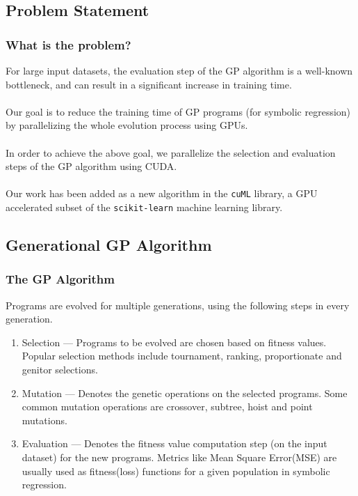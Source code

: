 \documentclass{beamer}
\begin{document}

\subsection{Problem Statement}

\begin{frame}
  \frametitle{What is the problem?}
  For large input datasets, the evaluation step of the GP algorithm is a well-known bottleneck, and can result in a significant increase in training time. \\~\\
  Our goal is to reduce the training time of GP programs (for symbolic regression) by parallelizing the whole evolution process using GPUs. \\~\\
  
  In order to achieve the above goal, we parallelize the selection and evaluation steps of the GP algorithm using CUDA. \\~\\
  
  Our work has been added as a new algorithm in the \texttt{cuML} library, a GPU accelerated subset of the \texttt{scikit-learn} machine learning library.
\end{frame}


\subsection{Generational GP Algorithm}

\begin{frame}
  \frametitle{The GP Algorithm}
  Programs are evolved for multiple generations, using the following steps in every generation. 
  \begin{enumerate}
    \item Selection --- Programs to be evolved are chosen based on fitness values. Popular selection methods include tournament, ranking, proportionate and genitor selections.
    \item Mutation --- Denotes the genetic operations on the selected programs. Some common mutation operations are crossover, subtree, hoist and point mutations.
    \item Evaluation --- Denotes the fitness value computation step (on the input dataset) for the new programs. Metrics like Mean Square Error(MSE) are usually used as fitness(loss) functions for a given population in symbolic regression.
  \end{enumerate}
\end{frame}
\end{document}
